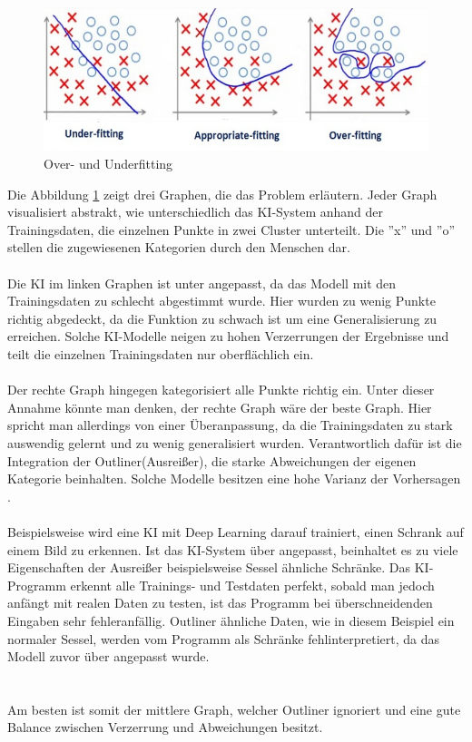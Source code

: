 \documentclass[12pt,oneside,a4paper,parskip]{scrbook}
\begin{document}
\begin{figure}[h]
	\begin{center}
		\includegraphics[width=12cm]{Bilder/overUnderfitting.png}
		\caption{Over- und Underfitting}
		\label{fig:overUnderFitting}
	\end{center}
\end{figure}
Die Abbildung \ref{fig:overUnderFitting} zeigt drei Graphen, die das Problem erläutern. Jeder Graph visualisiert abstrakt, wie unterschiedlich das KI-System anhand der Trainingsdaten, die einzelnen Punkte in zwei Cluster unterteilt. Die ''x'' und ''o'' stellen die zugewiesenen Kategorien durch den Menschen dar.
\\\\
Die KI im linken Graphen ist unter angepasst, da das Modell mit den Trainingsdaten zu schlecht abgestimmt wurde. Hier wurden zu wenig Punkte richtig abgedeckt, da die Funktion zu schwach ist um eine Generalisierung zu erreichen. Solche KI-Modelle neigen zu hohen Verzerrungen der Ergebnisse und teilt die einzelnen Trainingsdaten nur oberflächlich ein.
\\\\
Der rechte Graph hingegen kategorisiert alle Punkte richtig ein. Unter dieser Annahme könnte man denken, der rechte Graph wäre der beste Graph. Hier spricht man allerdings von einer Überanpassung, da die Trainingsdaten zu stark auswendig gelernt und zu wenig generalisiert wurden. Verantwortlich dafür ist die Integration der Outliner(Ausreißer), die starke Abweichungen der eigenen Kategorie beinhalten. Solche Modelle besitzen eine hohe Varianz der Vorhersagen \cite{overUnderfitting}.
\\\\
Beispielsweise wird eine KI mit Deep Learning darauf trainiert, einen Schrank auf einem Bild zu erkennen. Ist das KI-System über angepasst, beinhaltet es zu viele Eigenschaften der Ausreißer beispielsweise Sessel ähnliche Schränke. Das KI-Programm erkennt alle Trainings- und Testdaten perfekt, sobald man jedoch anfängt mit realen Daten zu testen, ist das Programm bei überschneidenden Eingaben sehr fehleranfällig. Outliner ähnliche Daten, wie in diesem Beispiel ein normaler Sessel, werden vom Programm als Schränke fehlinterpretiert, da das Modell zuvor über angepasst wurde. \\
\\\\
Am besten ist somit der mittlere Graph, welcher Outliner ignoriert und eine gute Balance zwischen Verzerrung und Abweichungen besitzt.
\end{document}
